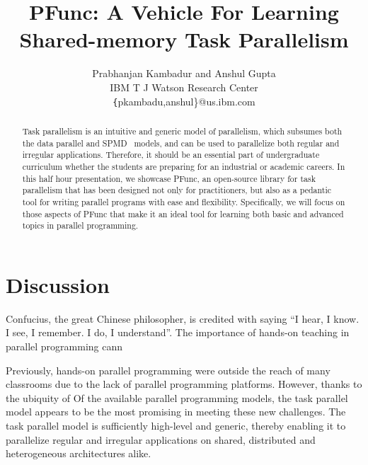 \documentclass[9pt,twocolumn,letter]{article}
\begin{document}
\title{PFunc: A Vehicle For Learning Shared-memory Task Parallelism}

\author{
Prabhanjan Kambadur and Anshul Gupta\\ 
IBM T J Watson Research Center\\
{\texttt \{pkambadu,anshul\}@us.ibm.com}
}

\date{}

\maketitle


\begin{abstract} 
Task parallelism is an intuitive and generic model of parallelism, which
subsumes both the data parallel and SPMD~\cite{darema2001} models, and can be
used to parallelize both regular and irregular applications.
%
Therefore, it should be an essential part of undergraduate curriculum whether
the students are preparing for an industrial or academic careers.
%
In this half hour presentation, we showcase PFunc, an open-source library for
task parallelism that has been designed not only for practitioners, but also as
a pedantic tool for writing parallel programs with ease and flexibility.
%
Specifically, we will focus on those aspects of PFunc that make it an ideal 
tool for learning both basic and advanced topics in parallel programming.
\end{abstract}

\section{Discussion}
Confucius, the great Chinese philosopher, is credited with saying ``I hear,
I know. I see, I remember. I do, I understand''.
%
The importance of hands-on teaching in parallel programming cann

%
Previously, hands-on parallel programming were outside the reach of many 
classrooms due to the lack of parallel programming platforms.
% 
However, thanks to the ubiquity of 
Of the available parallel programming models, the task parallel model appears
to be the most promising in meeting these new challenges.  The task parallel
model is sufficiently high-level and generic, thereby enabling it to
parallelize regular and irregular applications on shared, distributed and
heterogeneous architectures alike.  
\end{document}
